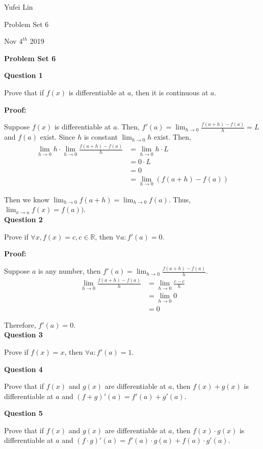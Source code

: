 \documentclass[a4paper,12pt]{report}
\begin{document}
\noindent
Yufei Lin

\noindent
Problem Set 6

\noindent
Nov \(4^{th}\) 2019

\begin{center}
\textbf{Problem Set 6}
\end{center}

\noindent
\textbf{Question 1}

\noindent
Prove that if $f(x)$ is differentiable at $a$, then it is continuous at $a$.

\noindent
\textbf{Proof: }

\noindent
Suppose $f(x)$ is differentiable at $a$. Then, $f'(a)=\displaystyle{\lim_{h\to 0}}\frac{f(a+h)-f(a)}{h} = L$ and $f(a)$ exist. Since $h$ is constant $\displaystyle{\lim_{h\to 0}h}$ exist. Then,
\begin{align*}
\displaystyle{\lim_{h\to 0}h}\cdot{\displaystyle{\lim_{h\to 0}}\frac{f(a+h)-f(a)}{h}}
 & = \displaystyle{\lim_{h\to 0}h}\cdot{L}\\
 & = 0\cdot{L}\\
 & = 0\\
 &=\displaystyle{\lim_{h\to 0}(f(a+h)-f(a))}
\end{align*}

\noindent
Then we know $\displaystyle{\lim_{h\to 0}f(a+h)}=\displaystyle{\lim_{h\to 0}f(a)}$. Thus, $\displaystyle{\lim_{x\to a}f(x)=f(a))}$.\\

\noindent
\textbf{Question 2}

\noindent
Prove if $\forall x, f(x)=c, c\in \mathbb{R}$, then $\forall a: f'(a) = 0$.

\noindent
\textbf{Proof: }

\noindent
Suppose $a$ is any number, then $f'(a)=\displaystyle{\lim_{h\to 0}}\frac{f(a+h)-f(a)}{h}$.
\begin{align*}
\displaystyle{\lim_{h\to 0}}\frac{f(a+h)-f(a)}{h}
 & = \displaystyle{\lim_{h\to 0}\frac{c-c}{h}}\\
 & = \displaystyle{\lim_{h\to 0}0}\\
 & = 0
\end{align*}

\noindent
Therefore, $f'(a) = 0$.\\

\noindent
\textbf{Question 3}

\noindent
Prove if $f(x)=x$, then $\forall a: f'(a) = 1$.

\noindent
\textbf{Question 4}

\noindent
Prove that if $f(x)$ and $g(x)$ are differentiable at $a$, then $f(x)+g(x)$ is differentiable at $a$ and $(f+g)'(a) = f'(a)+g'(a)$. 

\noindent
\textbf{Question 5}

\noindent
Prove that if $f(x)$ and $g(x)$ are differentiable at $a$, then $f(x)\cdot{g(x)}$ is differentiable at $a$ and $(f\cdot{g})'(a) = f'(a)\cdot{g(a)}+f(a)\cdot{g'(a)}$. 
\end{document}
